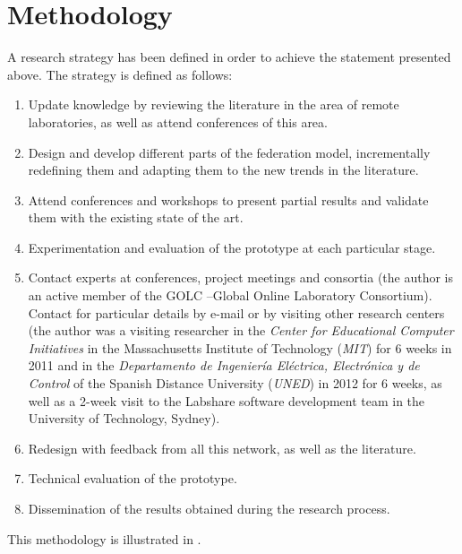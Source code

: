 \section{Methodology}

A research strategy has been defined in order to achieve the statement presented
above. The strategy is defined as follows:

\begin{enumerate}
    \item Update knowledge by reviewing the literature in the area of remote
    laboratories, as well as attend conferences of this area.
    \item Design and develop different parts of the federation model,
    incrementally redefining them and adapting them to the new trends in the
    literature. 
    \item Attend conferences and workshops to present partial results and
    validate them with the existing state of the art.
    \item Experimentation and evaluation of the prototype at each particular
    stage.
    \item Contact experts at conferences, project meetings and consortia
    (the author is an active member of the GOLC --Global Online Laboratory
    Consortium). Contact for particular details by e-mail or by visiting other
    research centers (the author was a visiting researcher in the \emph{Center
    for Educational Computer Initiatives} in the Massachusetts Institute of
    Technology (\emph{MIT}) for 6 weeks in 2011 and in the \emph{Departamento de
    Ingeniería Eléctrica, Electrónica y de Control} of the Spanish Distance
    University (\emph{UNED}) in 2012 for 6 weeks, as well as a 2-week visit to
    the Labshare software development team in the University of Technology,
    Sydney).  
    \item Redesign with feedback from all this network, as well as the
    literature.
    \item Technical evaluation of the prototype.
    \item Dissemination of the results obtained during the research process.
\end{enumerate}

This methodology is illustrated in .
